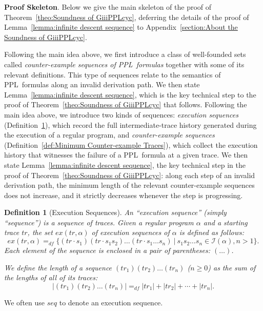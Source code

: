 \documentclass[manuscript,screen]{acmart}
\newtheorem{definition}{Definition}[section]
\newcommand{\mcl}[1]{\mathcal{#1}}
\newcommand{\dddef}[0]{=_{df}}
\newcommand{\ex}[0]{\textit{ex}}
\newcommand{\I}[0]{\mcl{I}}
\newcommand{\tra}[0]{\textbf{tr}}
\newcommand{\PPL}[0]{\mbox{PPL}}
\begin{document}
\textbf{Proof Skeleton}. 
Below we give the main skeleton of the proof of Theorem~\ref{theo:Soundness of GiiiPPLcyc}, deferring the details of the proof of Lemma~\ref{lemma:infinite descent sequence} to Appendix~\ref{section:About the Soundness of GiiiPPLcyc}.

\ifx
Following the main idea above, we first introduce a class of well-founded sets called \emph{counter-example sequences of \PPL\ formulas} together with some of its relevant definitions. This type of sequences relate to the semantics of \PPL\ formulas along an invalid derivation path.  We then state Lemma~\ref{lemma:infinite descent sequence}, which is the key technical step to the proof of Theorem~\ref{theo:Soundness of GiiiPPLcyc} that follows. 
\fi
Following the main idea above, we introduce two kinds of sequences: \emph{execution sequences} (Definition~\ref{def:Execution Sequences}), which record the full intermediate-trace history generated during the execution of a regular program, and \emph{counter-example sequences} (Definition~\ref{def:Minimum Counter-example Traces}), which collect the execution history that witnesses the failure of a \PPL\ formula at a given trace.  We then state Lemma~\ref{lemma:infinite descent sequence}, the key technical step in the proof of Theorem~\ref{theo:Soundness of GiiiPPLcyc}: along each step of an invalid derivation path, the minimum length of the relevant counter-example sequences does not increase, and it strictly decreases whenever the step is progressing. 

\begin{definition}[Execution Sequences]
\label{def:Execution Sequences}
An ``execution sequence'' (simply ``sequence'') is a sequence of traces. 
    Given a regular program $\alpha$ and a starting trace $tr$, 
the set $\ex(tr, \alpha)$ of execution sequences of $\alpha$ is defined as follows: 
$$\ex(tr, \alpha)\dddef \{(tr\cdot s_1)(tr\cdot s_1s_2)\ldots(tr\cdot s_1\ldots s_n)\ |\ s_1s_2\ldots s_n\in \I(\alpha), n > 1\}. $$ 
Each element of the sequence is enclosed in a pair of parentheses: $(\ldots)$. 

We define the length of a sequence $(tr_1)(tr_2)\ldots(tr_n)$ ($n\ge 0$) as the sum of the lengths of all of its traces: 
$$|(tr_1)(tr_2)\ldots(tr_n)|\dddef |tr_1|+|tr_2|+\cdots+|tr_n|. $$ 
\end{definition}
We often use $seq$ to denote an execution sequence. 
\end{document}

